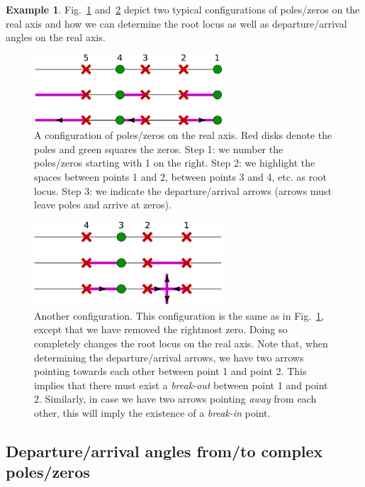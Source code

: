 \documentclass[a4paper,11pt]{report}
\theoremstyle{definition}
\newtheorem{mdexample}{Example}
\newenvironment{example}%
  {\vspace{0.1cm}\begin{mdframed}[backgroundcolor=lightgray]\begin{mdexample}}%
  {\end{mdexample}\end{mdframed}\vspace{0.1cm}}
\begin{document}
\begin{example}
  Fig.~\ref{fig:real} and~\ref{fig:real2} depict two typical
  configurations of poles/zeros on the real axis and how we can
  determine the root locus as well as departure/arrival angles on the
  real axis.
  \begin{figure}[H]
    \centering
    \includegraphics[width=7cm]{fig/real.pdf}
    \caption{A configuration of poles/zeros on the real axis. Red
      disks denote the poles and green squares the zeros. Step 1: we
      number the poles/zeros starting with 1 on the right. Step 2: we
      highlight the spaces between points 1 and 2, between points 3
      and 4, etc. as root locus. Step 3: we indicate the
      departure/arrival arrows (arrows must leave poles and arrive at
      zeros).}
    \label{fig:real}
  \end{figure}

  \begin{figure}[H]
    \centering
    \includegraphics[width=7cm]{fig/real2.pdf}
    \caption{Another configuration. This configuration is the same as
      in Fig.~\ref{fig:real}, except that we have removed the
      rightmost zero. Doing so completely changes the root locus on
      the real axis. Note that, when determining the departure/arrival
      arrows, we have two arrows pointing towards each other between
      point 1 and point 2. This implies that there must exist a
      \emph{break-out} between point 1 and point 2. Similarly, in case
      we have two arrows pointing \emph{away} from each other, this
      will imply the existence of a \emph{break-in} point.}
    \label{fig:real2}
  \end{figure}
\end{example}


\subsection{Departure/arrival angles from/to complex poles/zeros}
\end{document}

